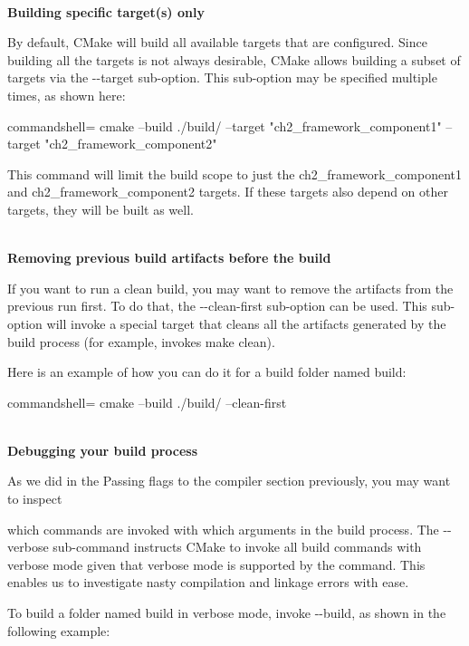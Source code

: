 \hspace*{\fill} \\ %
\noindent
\textbf{Building specific target(s) only}

By default, CMake will build all available targets that are configured. Since building all the targets is not always desirable, CMake allows building a subset of targets via the -{}-target sub-option. This sub-option may be specified multiple times, as shown here:

\begin{tcblisting}{commandshell={}}
cmake --build ./build/ --target "ch2_framework_component1"
--target "ch2_framework_component2"
\end{tcblisting}

This command will limit the build scope to just the ch2\_framework\_component1 and ch2\_framework\_component2 targets. If these targets also depend on other targets, they will be built as well.

\hspace*{\fill} \\ %
\noindent
\textbf{Removing previous build artifacts before the build}

If you want to run a clean build, you may want to remove the artifacts from the  previous run first. To do that, the -{}-clean-first sub-option can be used. This sub-option will invoke a special target that cleans all the artifacts generated by the build process (for example, invokes make clean).

Here is an example of how you can do it for a build folder named build:

\begin{tcblisting}{commandshell={}}
cmake --build ./build/ --clean-first
\end{tcblisting}

\hspace*{\fill} \\ %
\noindent
\textbf{Debugging your build process}

As we did in the Passing flags to the compiler section previously, you may want to inspect

which commands are invoked with which arguments in the build process. The -{}-verbose sub-command instructs CMake to invoke all build commands with verbose mode given that verbose mode is supported by the command. This enables us to investigate nasty compilation and linkage errors with ease.

To build a folder named build in verbose mode, invoke -{}-build, as shown in the following example:

